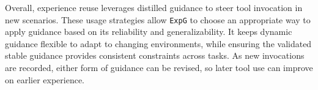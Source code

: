 \documentclass[11pt]{article}
\newcommand{\ours}{\texttt{ExpG}}
\begin{document}
Overall, experience reuse leverages distilled guidance to steer tool invocation in new scenarios. These usage strategies allow {\ours} to choose an appropriate way to apply guidance based on its reliability and generalizability. It keeps dynamic guidance flexible to adapt to changing environments, while ensuring the validated stable guidance provides consistent constraints across tasks. As new invocations are recorded, either form of guidance can be revised, so later tool use can improve on earlier experience.
\end{document}
